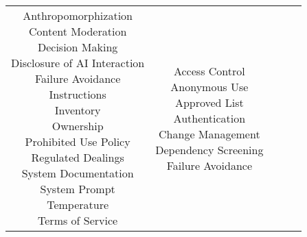 \documentclass[fleqn]{article}
\begin{document}
\begin{landscape}
\begin{table}[H]
\begin{tabular}{|c|c|c|c|c|}
{			\textbullet\hspace{3pt} Anthropomorphization \\ 		
			\textbullet\hspace{3pt} Content Moderation\\ 	
			\textbullet\hspace{3pt} Decision Making\\ 	
			\textbullet\hspace{3pt} Disclosure of AI Interaction\\ 	
			\textbullet\hspace{3pt} Failure Avoidance\\ 	
			\textbullet\hspace{3pt} Instructions\\ 	
			\textbullet\hspace{3pt} Inventory\\ 	
			\textbullet\hspace{3pt} Ownership\\ 	
			\textbullet\hspace{3pt} Prohibited Use Policy\\ 	
			\textbullet\hspace{3pt} Regulated Dealings\\ 	
			\textbullet\hspace{3pt} System Documentation\\ 	
			\textbullet\hspace{3pt} System Prompt\\ 	
			\textbullet\hspace{3pt} Temperature\\ 	
			\textbullet\hspace{3pt} Terms of Service \\
		}
		&
		\makecell[l]{
			\textbullet\hspace{3pt} Access Control\\ 	
			\textbullet\hspace{3pt} Anonymous Use\\ 	
			\textbullet\hspace{3pt} Approved List\\ 	
			\textbullet\hspace{3pt} Authentication\\ 	
			\textbullet\hspace{3pt} Change Management\\ 	
			\textbullet\hspace{3pt} Dependency Screening\\ 	
			\textbullet\hspace{3pt} Failure Avoidance\\ 	
}
\end{tabular}
\end{table}
\end{landscape}
\end{document}
